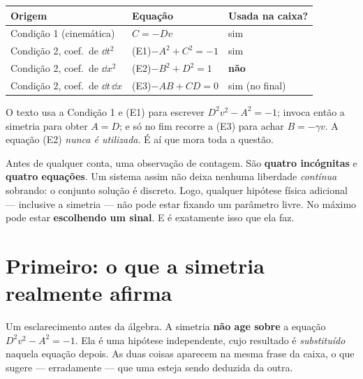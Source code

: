 \documentclass[12pt,a4paper,oneside]{book}
\begin{document}
\vspace{4pt}
\begin{center}
\small
\begin{tabular}{@{}l l l@{}}
\toprule
\textbf{Origem} & \textbf{Equação} & \textbf{Usada na caixa?}\\
\midrule
Condição 1 (cinemática) & $C=-Dv$ & sim \\
Condição 2, coef.\ de $\dd t^2$ \hspace{1em} & (E1)\quad $-A^2+C^2=-1$ & sim \\
Condição 2, coef.\ de $\dd x^2$ & (E2)\quad $-B^2+D^2=1$  & \textcolor{rgTerracota}{\textbf{não}} \\
Condição 2, coef.\ de $\dd t\,\dd x$ & (E3)\quad $-AB+CD=0$ & sim (no final) \\
\bottomrule
\end{tabular}
\end{center}
\vspace{4pt}

\noindent
O texto usa a Condição 1 e (E1) para escrever $D^2v^2-A^2=-1$; invoca então
a simetria para obter $A=D$; e só no fim recorre a (E3) para achar
$B=-\gamma v$. A equação (E2) \emph{nunca é utilizada}. É aí que mora toda a
questão.

\begin{atencao}
Antes de qualquer conta, uma observação de contagem. São
\textbf{quatro incógnitas} e \textbf{quatro equações}. Um sistema assim não
deixa nenhuma liberdade \emph{contínua} sobrando: o conjunto solução é
discreto. Logo, qualquer hipótese física adicional --- inclusive a simetria
--- não pode estar fixando um parâmetro livre. No máximo pode estar
\textbf{escolhendo um sinal}. E é exatamente isso que ela faz.
\end{atencao}

\section{Primeiro: o que a simetria realmente afirma}

Um esclarecimento antes da álgebra. A simetria \textbf{não age sobre} a
equação $D^2v^2-A^2=-1$. Ela é uma hipótese independente, cujo resultado é
\emph{substituído} naquela equação depois. As duas coisas aparecem na mesma
frase da caixa, o que sugere --- erradamente --- que uma esteja sendo
deduzida da outra.
\end{document}
